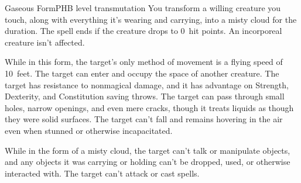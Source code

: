 \begin{spell}{Gaseous Form}{PHB}{ level transmutation}
{
}
You transform a willing creature you touch, along with
everything it's wearing and carrying, into a misty cloud
for the duration. The spell ends if the creature drops to
0~hit points. An incorporeal creature isn't affected.

While in this form, the target's only method of
movement is a flying speed of 10~feet. The target can
enter and occupy the space of another creature. The
target has resistance to nonmagical damage, and it has
advantage on Strength, Dexterity, and Constitution
saving throws. The target can pass through small holes,
narrow openings, and even mere cracks, though it treats
liquids as though they were solid surfaces. The target
can't fall and remains hovering in the air even when
stunned or otherwise incapacitated.

While in the form of a misty cloud, the target can't talk
or manipulate objects, and any objects it was carrying or
holding can't be dropped, used, or otherwise interacted
with. The target can't attack or cast spells.
\end{spell}